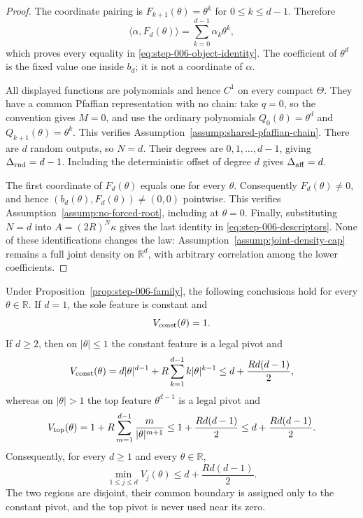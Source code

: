 \begin{proof}
The coordinate pairing is $F_{k+1}(\theta)=\theta^k$ for
$0\leq k\leq d-1$.  Therefore
\[
\langle\alpha,F_d(\theta)\rangle
=\sum_{k=0}^{d-1}\alpha_k\theta^k,
\]
which proves every equality in \eqref{eq:step-006-object-identity}.  The
coefficient of $\theta^d$ is the fixed value one inside $b_d$; it is not a
coordinate of $\alpha$.

All displayed functions are polynomials and hence $C^1$ on every compact
$\Theta$.  They have a common Pfaffian representation with no chain: take
$q=0$, so the convention gives $M=0$, and use the ordinary polynomials
$Q_0(\theta)=\theta^d$ and
$Q_{k+1}(\theta)=\theta^k$.  This verifies
Assumption~\ref{assump:shared-pfaffian-chain}.  There are $d$ random
outputs, so $N=d$.  Their degrees are $0,1,\ldots,d-1$, giving
$\Delta_{\rm rnd}=d-1$.  Including the deterministic offset of degree $d$
gives $\Delta_{\rm aff}=d$.

The first coordinate of $F_d(\theta)$ equals one for every $\theta$.
Consequently $F_d(\theta)\neq0$, and hence
$(b_d(\theta),F_d(\theta))\neq(0,0)$ pointwise.  This verifies
Assumption~\ref{assump:no-forced-root}, including at $\theta=0$.  Finally,
substituting $N=d$ into $A=(2R)^N\kappa$ gives the last identity in
\eqref{eq:step-006-descriptors}.  None of these identifications changes the
law: Assumption~\ref{assump:joint-density-cap} remains a full joint density
on $\mathbb R^d$, with arbitrary correlation among the lower coefficients.
\end{proof}

\begin{lemma}
\label{lem:step-006-two-pivots}
Under Proposition~\ref{prop:step-006-family}, the following conclusions hold
for every $\theta\in\mathbb R$.  If $d=1$, the sole feature is constant and
\begin{equation}
V_{\rm const}(\theta)=1.
\label{eq:step-006-d1-pivot}
\end{equation}
If $d\geq2$, then on $|\theta|\leq1$ the constant feature is a legal pivot
and
\begin{equation}
V_{\rm const}(\theta)
=d|\theta|^{d-1}
+R\sum_{k=1}^{d-1}k|\theta|^{k-1}
\leq d+\frac{Rd(d-1)}2,
\label{eq:step-006-constant-pivot}
\end{equation}
whereas on $|\theta|>1$ the top feature $\theta^{d-1}$ is a legal pivot and
\begin{equation}
V_{\rm top}(\theta)
=1+R\sum_{m=1}^{d-1}\frac{m}{|\theta|^{m+1}}
\leq1+\frac{Rd(d-1)}2
\leq d+\frac{Rd(d-1)}2.
\label{eq:step-006-top-pivot}
\end{equation}
Consequently, for every $d\geq1$ and every $\theta\in\mathbb R$,
\begin{equation}
\min_{1\leq j\leq d}V_j(\theta)
\leq d+\frac{Rd(d-1)}2.
\label{eq:step-006-pointwise-min}
\end{equation}
The two regions are disjoint, their common boundary is assigned only to the
constant pivot, and the top pivot is never used near its zero.
\end{lemma}

